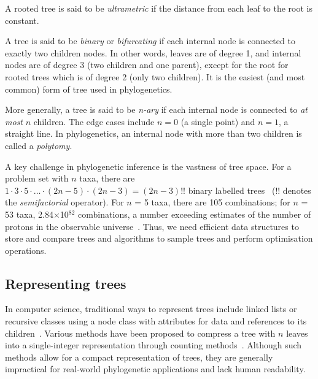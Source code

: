 A rooted tree is said to be \textit{ultrametric} if the distance from each leaf to the root is constant.

A tree is said to be \textit{binary} or \textit{bifurcating} if each internal node is connected to exactly two children nodes. In other words, leaves are of degree 1, and internal nodes are of degree 3 (two children and one parent), except for the root for rooted trees which is of degree 2 (only two children). It is the easiest (and most common) form of tree used in phylogenetics.

More generally, a tree is said to be \textit{n-ary} if each internal node is connected to \textit{at most} $n$ children. The edge cases include $n = 0$ (a single point) and $n = 1$, a straight line. In phylogenetics, an internal node with more than two children is called a \textit{polytomy}.

A key challenge in phylogenetic inference is the vastness of tree space. For a problem set with $n$ taxa, there are $1\cdot3\cdot5\cdot\ldots\cdot (2n-5) \cdot (2n-3) = (2n-3)!!$ binary labelled trees~\cite{cavallisforza1967} ($!!$ denotes the \emph{semifactorial} operator). For $n$ = 5 taxa, there are 105 combinations; for $n$ = 53 taxa, 2.84$\times$10$^{82}$ combinations, a number exceeding estimates of the number of protons in the observable universe~\cite{eddington1946}. Thus, we need efficient data structures to store and compare trees and algorithms to sample trees and perform optimisation operations.



\subsection{Representing trees}

In computer science, traditional ways to represent trees include linked lists or recursive classes using a node class with attributes for data and references to its children~\cite{knuth1997}. Various methods have been proposed to compress a tree with $n$ leaves into a single-integer representation through counting methods~\cite{knuth1973, rotem1978, proskurowski1980, rohlf1983, palacios2022}. Although such methods allow for a compact representation of trees, they are generally impractical for real-world phylogenetic applications and lack human readability.

